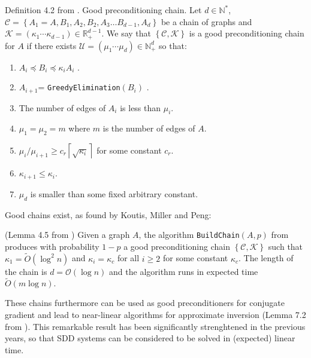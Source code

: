 \begin{definition} Definition 4.2 from \cite{Koutis2011}. Good preconditioning
chain. Let $d\in\mathbb{N}^{*}$, $\mathcal{C}=\left\{ A_{1}=A,B_{1},A_{2},B_{2},A_{3}\dots B_{d-1},A_{d}\right\} $
be a chain of graphs and $\mathcal{K}=\left(\kappa_{1}\cdots\kappa_{d-1}\right)\in\mathbb{R}_{+}^{d-1}$.
We say that $\left\{ \mathcal{C},\mathcal{K}\right\} $ is a good
preconditioning chain for $A$ if there exists $\mathcal{U}=\left(\mu_{1}\cdots\mu_{d}\right)\in\mathbb{N}_{+}^{d}$
so that:
\begin{enumerate}
\item $A_{i}\preceq B_{i}\preceq\kappa_{i}A_{i}$ .
\item $A_{i+1}$= \texttt{GreedyElimination}$\left(B_{i}\right)$ . %
\item The number of edges of $A_{i}$ is less than $\mu_{i}$.
\item $\mu_{1}=\mu_{2}=m$ where $m$ is the number of edges of $A$.
\item $\mu_{i}/\mu_{i+1}\geq c_{r}\left\lceil \sqrt{\kappa_{i}}\right\rceil $
for some constant $c_{r}$. 
\item $\kappa_{i+1}\leq\kappa_{i}$.
\item $\mu_{d}$ is smaller than some fixed arbitrary constant.
\end{enumerate}
\end{definition}

Good chains exist, as found by Koutis, Miller and Peng:

\begin{lemma} \label{lem:good-chain} (Lemma 4.5 from \cite{Koutis2011})
Given a graph $A$, the algorithm \texttt{BuildChain}$\left(A,p\right)$ from \cite{Koutis2011}
produces with probability $1-p$ a good preconditioning chain $\left\{ \mathcal{C},\mathcal{K}\right\}$ such that $\kappa_1 = \tilde{O}\left(\log^{2}n\right)$ and $\kappa_i = \kappa_{c}$ for all $i \geq 2$ for some constant $\kappa_{c}$. The length of the chain is $d = \mathcal{O}\left(\log n\right)$ and the algorithm runs in expected time $\tilde{O}\left(m\log n\right).$%


\end{lemma}

These chains furthermore can be used as good preconditioners for conjugate
gradient and lead to near-linear algorithms for approximate inversion
(Lemma 7.2 from \cite{Koutis2010}). This remarkable result has been
significantly strenghtened in the previous years, so that SDD systems
can be considered to be solved in (expected) linear time.

